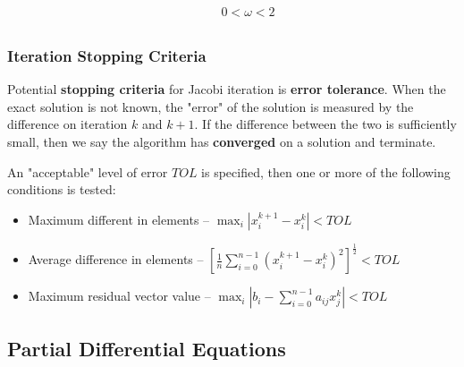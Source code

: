 \documentclass{article}
\begin{document}
\begin{multline}
                                                                                                                                                                                                                                                                                                                                                                                                                                                                                                                                                                                                                                                                                                                                                                                                                                                                                                                                                                                                                                                                                     \;\;\;\;\;\;\;\;\; 0 < \omega < 2 \\
	\label{eq:sor}
\end{multline}

\subsubsection{Iteration Stopping Criteria}
\label{sec:stopping-criteria}

Potential \textbf{stopping criteria} for Jacobi iteration is \textbf{error tolerance}. When the exact solution is not known, the "error" of the solution is measured by the difference on iteration $k$ and $k+1$. If the difference between the two is sufficiently small, then we say the algorithm has \textbf{converged} on a solution and terminate.

An "acceptable" level of error $TOL$ is specified, then one or more of the following conditions is tested:
\begin{itemize}
	\item Maximum different in elements -- $\max_{i} |x_i^{k+1} - x_i^k| < TOL$
	\item Average difference in elements -- $[\frac{1}{n} \sum_{i=0}^{n - 1} (x_i^{k + 1} - x_i^k)^2 ]^{\frac{1}{2}} < TOL$
	\item Maximum residual vector value -- $\max_{i} |b_i - \sum_{i=0}^{n - 1} { a_{ij}x_j^k } | < TOL$
\end{itemize}

\subsection{Partial Differential Equations}
\end{document}
